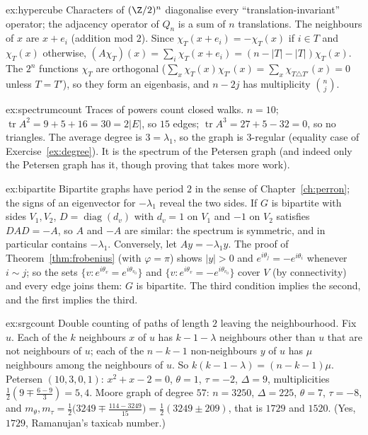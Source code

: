 \begin{solution}{ex:hypercube}
\idea Characters of $(\Z/2)^n$ diagonalise every ``translation-invariant'' operator; the adjacency operator of $Q_n$ is a sum of
$n$ translations.
\writeup The neighbours of $x$ are $x+e_i$ (addition mod $2$). Since $\chi_T(x+e_i)=-\chi_T(x)$ if $i\in T$ and $\chi_T(x)$ otherwise,
$(A\chi_T)(x)=\sum_i\chi_T(x+e_i)=(n-|T|-|T|)\chi_T(x)$. The $2^n$ functions $\chi_T$ are orthogonal ($\sum_x\chi_T(x)\chi_{T'}(x)=
\sum_x\chi_{T\triangle T'}(x)=0$ unless $T=T'$), so they form an eigenbasis, and $n-2j$ has multiplicity $\binom nj$.
\end{solution}

\begin{solution}{ex:spectrumcount}
\idea Traces of powers count closed walks.
\writeup $n=10$; $\operatorname{tr}A^2=9+5+16=30=2|E|$, so $15$ edges; $\operatorname{tr}A^3=27+5-32=0$, so no triangles. The
average degree is $3=\lambda_1$, so the graph is $3$-regular (equality case of Exercise~\ref{ex:degree}). It is the spectrum of the
Petersen graph (and indeed only the Petersen graph has it, though proving that takes more work).
\end{solution}

\begin{solution}{ex:bipartite}
\idea Bipartite graphs have period $2$ in the sense of Chapter~\ref{ch:perron}; the signs of an eigenvector for $-\lambda_1$ reveal the two
sides.
\writeup If $G$ is bipartite with sides $V_1,V_2$, $D=\operatorname{diag}(d_v)$ with $d_v=1$ on $V_1$ and $-1$ on $V_2$ satisfies
$DAD=-A$, so $A$ and $-A$ are similar: the spectrum is symmetric, and in particular contains $-\lambda_1$. Conversely, let $Ay=-\lambda_1y$.
The proof of Theorem~\ref{thm:frobenius} (with $\varphi=\pi$) shows $|y|>0$ and $e^{i\theta_j}=-e^{i\theta_i}$ whenever $i\sim j$; so the
sets $\{v:e^{i\theta_v}=e^{i\theta_{v_0}}\}$ and $\{v:e^{i\theta_v}=-e^{i\theta_{v_0}}\}$ cover $V$ (by connectivity) and every edge joins
them: $G$ is bipartite. The third condition implies the second, and the first implies the third.
\end{solution}

\begin{solution}{ex:srgcount}
\idea Double counting of paths of length $2$ leaving the neighbourhood.
\writeup Fix $u$. Each of the $k$ neighbours $x$ of $u$ has $k-1-\lambda$ neighbours other than $u$ that are not neighbours of $u$; each
of the $n-k-1$ non-neighbours $y$ of $u$ has $\mu$ neighbours among the neighbours of $u$. So $k(k-1-\lambda)=(n-k-1)\mu$. Petersen
$(10,3,0,1)$: $x^2+x-2=0$, $\theta=1$, $\tau=-2$, $\Delta=9$, multiplicities $\frac12(9\mp\frac{6-9}3)=5,4$. Moore graph of degree $57$:
$n=3250$, $\Delta=225$, $\theta=7$, $\tau=-8$, and $m_\theta,m_\tau=\frac12\bigl(3249\mp\frac{114-3249}{15}\bigr)=\frac12(3249\pm209)$, that is
$1729$ and $1520$. (Yes, $1729$, Ramanujan's taxicab number.)
\end{solution}

